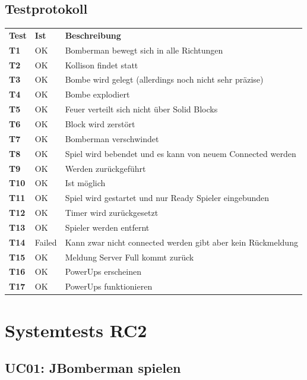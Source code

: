 \documentclass[11pt]{scrartcl}
\begin{document}
\subsection{Testprotokoll}
\begin{tabularx}{\linewidth}{l l X}
  \bf{Test} & \bf{Ist} & \bf{Beschreibung} \\
  \bf{T1} & OK & Bomberman bewegt sich in alle Richtungen\\
  \bf{T2} & OK &  Kollison findet statt\\
  \bf{T3} & OK  & Bombe wird gelegt (allerdings noch nicht sehr präzise)\\
  \bf{T4} & OK &  Bombe explodiert\\
  \bf{T5} & OK & Feuer verteilt sich nicht über Solid Blocks\\
  \bf{T6} & OK &  Block wird zerstört\\
  \bf{T7} & OK & Bomberman verschwindet\\
  \bf{T8} & OK & Spiel wird bebendet und es kann von neuem Connected werden\\
  \bf{T9} & OK & Werden zurückgeführt\\
  \bf{T10} & OK & Ist möglich\\
  \bf{T11} & OK& Spiel wird gestartet und nur Ready Spieler eingebunden\\
  \bf{T12} & OK &  Timer wird zurückgesetzt\\
  \bf{T13} & OK &  Spieler werden entfernt\\
  \bf{T14} & Failed & Kann zwar nicht connected werden gibt aber kein Rückmeldung \\
  \bf{T15} & OK & Meldung Server Full kommt zurück\\
  \bf{T16} & OK & PowerUps erscheinen\\
  \bf{T17} & OK & PowerUps funktionieren\\
\end{tabularx}

\section{Systemtests RC2}
\subsection{UC01: JBomberman spielen}
\end{document}

